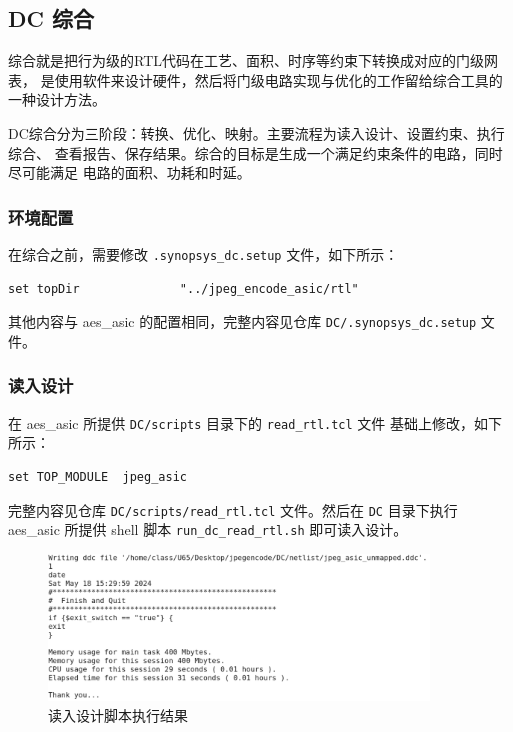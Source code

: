 \documentclass[12pt,hyperref,a4paper,UTF8]{ctexart}
\begin{document}
\subsection{DC 综合}
综合就是把行为级的RTL代码在工艺、面积、时序等约束下转换成对应的门级网表，
是使用软件来设计硬件，然后将门级电路实现与优化的工作留给综合工具的一种设计方法。

DC综合分为三阶段：转换、优化、映射。主要流程为读入设计、设置约束、执行综合、
查看报告、保存结果。综合的目标是生成一个满足约束条件的电路，同时尽可能满足
电路的面积、功耗和时延。

\subsubsection{环境配置}
在综合之前，需要修改 \texttt{.synopsys\_dc.setup} 文件，如下所示：

\begin{lstlisting}[style=tclstyle,name=.synopsys_dc.setup]
    set topDir              "../jpeg_encode_asic/rtl"
\end{lstlisting}

其他内容与 aes\_asic 的配置相同，完整内容见仓库 \texttt{DC/.synopsys\_dc.setup} 文件。

\subsubsection{读入设计}
在 aes\_asic 所提供 \texttt{DC/scripts} 目录下的 \texttt{read\_rtl.tcl} 文件
基础上修改，如下所示：

\begin{lstlisting}[style=tclstyle,name=read_rtl.tcl]
    set TOP_MODULE  jpeg_asic
\end{lstlisting}

完整内容见仓库 \texttt{DC/scripts/read\_rtl.tcl} 文件。然后在 \texttt{DC} 目录下执行
aes\_asic 所提供 shell 脚本 \texttt{run\_dc\_read\_rtl.sh} 即可读入设计。
\begin{figure}[htbp]
    \centering
    \includegraphics[width =0.9\textwidth]{figures/dc_read_rtl.png}
    \caption{读入设计脚本执行结果}
    \label{dc_read_rtl}
\end{figure}
\end{document}

